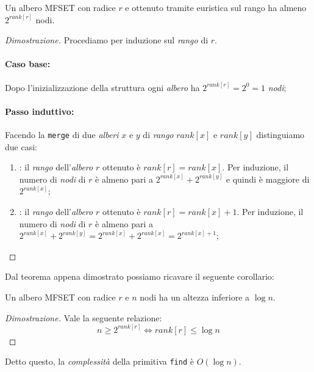 \begin{definition}
    Un albero MFSET con radice $r$ e ottenuto tramite euristica sul rango ha
    almeno $2^{rank[r]}$ nodi.
\end{definition}
\begin{proof}[Dimostrazione]
    Procediamo per induzione sul \emph{rango} di $r$.

    \paragraph{Caso base: }
    Dopo l'inizializzazione della struttura ogni \emph{albero} ha $2^{rank[r]}
    =2^0=1$ \emph{nodi};

    \paragraph{Passo induttivo: }
    Facendo la \texttt{merge} di due \emph{alberi} $x$ e $y$ di \emph{rango}
    $rank[x]$ e $rank[y]$ distinguiamo due casi:
    \begin{enumerate}
        \item {}: il \emph{rango} dell'\emph{albero} $r$
        ottenuto è $rank[r]=rank[x]$. Per induzione, il numero di \emph{nodi} di
        $r$ è almeno pari a $2^{rank[x]}+2^{rank[y]}$ e quindi è maggiore di
        $2^{rank[x]}$;
        \item {}: il \emph{rango} dell'\emph{albero} $r$
        ottenuto è $rank[r]=rank[x]+1$. Per induzione, il numero di \emph{nodi}
        di $r$ è almeno pari a $2^{rank[x]}+2^{rank[y]}=2^{rank[x]}+2^{rank[x]}=
        2^{rank[x]+1}$;
    \end{enumerate}
\end{proof}

\noindent
Dal teorema appena dimostrato possiamo ricavare il seguente corollario:
\begin{definition}[Corollario]
    Un albero MFSET con radice $r$ e $n$ nodi ha un altezza inferiore a $\log n$.
\end{definition}
\begin{proof}[Dimostrazione]
    Vale la seguente relazione:
    \[n\geq 2^{rank[r]}\Leftrightarrow rank[r]\leq\log n\]
\end{proof}

\noindent
Detto questo, la \emph{complessità} della primitiva \texttt{find} è $O(\log n)$.

